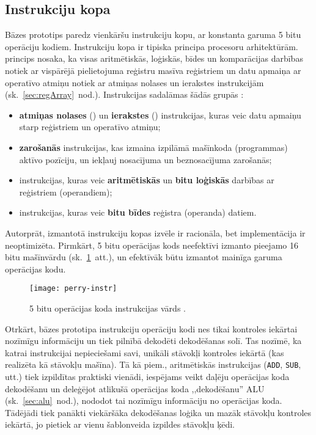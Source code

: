 \subsection{Instrukciju kopa}
	Bāzes prototips paredz vienkāršu instrukciju kopu, ar konstanta garuma
	5 bitu operāciju kodiem. Instrukciju kopa ir tipiska 
	principa procesoru arhitektūrām.  princips nosaka, ka
	visas aritmētiskās, loģiskās, bīdes un komparācijas darbības notiek
	ar vispārējā pielietojuma reģistru masīva reģistriem un datu apmaiņa ar
	operatīvo atmiņu notiek ar atmiņas nolases un ierakstes instrukcijām
	\cite[11.~lpp.]{Flynn-arch}	(sk.~\ref{sec:regArray}~nod.).
	Instrukcijas sadalāmas šādās grupās \cite[291.~lpp.]{Perry-VHDL}:
	\begin{itemize}
		\item \textbf{atmiņas nolases} () un \textbf{ierakstes}
			() instrukcijas, kuras
			veic datu apmaiņu starp reģistriem un operatīvo atmiņu;
		\item \textbf{zarošanās} instrukcijas, kas izmaina
			izpilāmā mašīnkoda (programmas) aktīvo pozīciju, un iekļauj
			nosacījuma un beznosacījuma zarošanās;
		\item instrukcijas, kuras veic \textbf{aritmētiskās} un 
			\textbf{bitu loģiskās} darbības ar reģistriem (operandiem);
		\item instrukcijas, kuras veic \textbf{bitu bīdes} reģistra
			(operanda) datiem.
	\end{itemize}
	
	Autorprāt, izmantotā instrukciju kopas izvēle ir racionāla, bet
	implementācija ir neoptimizēta. Pirmkārt, 5 bitu operācijas kods
	neefektīvi izmanto pieejamo 16 bitu mašīnvārdu
	(sk.~\ref{fig:5bit-opcode}~att.), un efektīvāk būtu izmantot mainīga
	garuma operācijas kodu.
	\begin{figure}[thb]
		\centering
		\texttt{[image: perry-instr]}
		\caption[5 bitu operācijas koda instrukcijas vārds.]
		        {5 bitu operācijas koda instrukcijas vārds \cite[292.~lpp.]{Perry-VHDL}.}
		\label{fig:5bit-opcode}
	\end{figure}
	
	Otrkārt, bāzes prototipa instrukciju operāciju kodi nes tikai kontroles
	iekārtai nozīmīgu informāciju un tiek pilnībā dekodēti dekodēšanas solī.
	Tas nozīmē, ka katrai instrukcijai nepieciešami savi, unikāli stāvokļi
	kontroles iekārtā (kas realizēta kā stāvokļu mašīna). Tā kā piem., 
	aritmētiskās instrukcijas (\texttt{ADD}, \texttt{SUB}, utt.)
	tiek izpildītas praktiski vienādi, iespējams veikt daļēju operācijas
	koda dekodēšanu un deleģējot atlikušā operācijas koda ,,dekodēšanu''
	ALU (sk.~\ref{sec:alu}~nod.), nododot tai nozīmīgu informāciju no
	operācijas koda. Tādējādi tiek panākti viekāršāka dekodēšanas loģika un 
	mazāk stāvokļu kontroles iekārtā, jo pietiek ar vienu šablonveida
	izpildes stāvokļu ķēdi.
	
